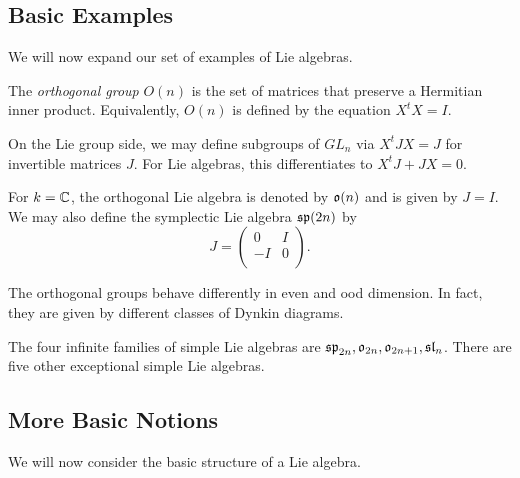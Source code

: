 \documentclass[twoside, 10pt]{article}
\begin{document}
    \subsection{Basic Examples}%
    \label{sub:basic_examples}
    
    

    We will now expand our set of examples of Lie algebras.

    \begin{exm}
        The \textit{orthogonal group} $O(n)$ is the set of matrices that preserve a Hermitian inner product. Equivalently, $O(n)$ is defined by the equation $X^tX = I$.
    \end{exm}

    \begin{rmk}
        On the Lie group side, we may define subgroups of $GL_n$ via $X^tJX = J$ for invertible matrices $J$. For Lie algebras, this differentiates to $X^tJ + JX = 0$.
    \end{rmk}

    \begin{exm}
        For $k = \mathbb{C}$, the orthogonal Lie algebra is denoted by $\mathfrak{o}(n)$ and is given by $J = I$. We may also define the symplectic Lie algebra $\mathfrak{sp}(2n)$ by \[J = \begin{pmatrix}
            0 & I \\
            -I & 0 \\
        \end{pmatrix}. \]
    \end{exm}

    \begin{rmk}
        The orthogonal groups behave differently in even and ood dimension. In fact, they are given by different classes of Dynkin diagrams.
    \end{rmk}

    \begin{rmk}
        The four infinite families of simple Lie algebras are $\mathfrak{sp}_{2n}, \mathfrak{o}_{2n}, \mathfrak{o}_{2n+1}, \mathfrak{sl}_n$. There are five other exceptional simple Lie algebras.
    \end{rmk}

    \subsection{More Basic Notions}%
    \label{sub:more_basic_notions}
    
    

    We will now consider the basic structure of a Lie algebra.
\end{document}
